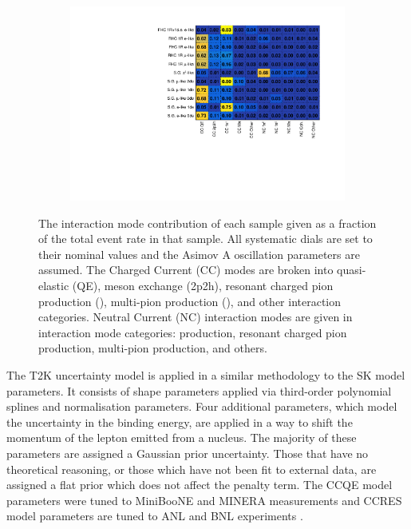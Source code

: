 \begin{figure}[h]
  \begin{subfigure}[t]{\textwidth}
    \includegraphics[width=\textwidth, trim={0mm 0mm 0mm 0mm}, clip,page=1]{Figures/Selections/FractionalModeComparison.pdf}
  \end{subfigure}
  \caption{The interaction mode contribution of each sample given as a fraction of the total event rate in that sample. All systematic dials are set to their nominal values and the Asimov A oscillation parameters are assumed. The Charged Current (CC) modes are broken into quasi-elastic (QE), meson exchange (2p2h), resonant charged pion production (\quickmath{1\pi^{\pm}}), multi-pion production (), and other interaction categories. Neutral Current (NC) interaction modes are given in interaction mode categories:  production, resonant charged pion production,  multi-pion production, and others.}
  \label{fig:SelsAndSysts_FractionalModeComparison}
\end{figure}

The T2K uncertainty model is applied in a similar methodology to the SK model parameters. It consists of  shape parameters applied via third-order polynomial splines and  normalisation parameters. Four additional parameters, which model the uncertainty in the binding energy, are applied in a way to shift the momentum of the lepton emitted from a nucleus. The majority of these parameters are assigned a Gaussian prior uncertainty. Those that have no theoretical reasoning, or those which have not been fit to external data, are assigned a flat prior which does not affect the penalty term. The CCQE model parameters were tuned to MiniBooNE \cite{miniboone_nu_ccqe} and MINER\quickmath{\nu}A \cite{minerva_nubar_ccqe} measurements and CCRES model parameters are tuned to ANL and BNL experiments \cite{ANL_BNL_corr}.

